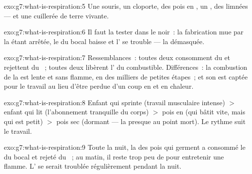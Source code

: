 \begin{solution}{exo:g7:what-is-respiration:5}
Une souris, un cloporte, des pois en , un , des
limnées --- et une cuillerée de terre vivante.
\end{solution}

\begin{solution}{exo:g7:what-is-respiration:6}
Il faut la tester dans le noir~: la fabrication mue par la 
étant arrêtée, le  du bocal baisse et l' se
trouble --- la  démasquée.
\end{solution}

\begin{solution}{exo:g7:what-is-respiration:7}
Ressemblances~: toutes deux consomment du  et rejettent du
~; toutes deux libèrent l' du combustible.
Différences~: la combustion de la  est lente et sans flamme,
en des milliers de petites étapes~; et son  est captée pour
le travail au lieu d'être perdue d'un coup en  et en chaleur.
\end{solution}

\begin{solution}{exo:g7:what-is-respiration:8}
Enfant qui sprinte (travail musculaire intense) $>$ enfant qui lit
(l'abonnement tranquille du corps) $>$ pois en  (qui
bâtit vite, mais qui est petit) $>$ pois sec (dormant --- la
 presque au point mort). Le rythme suit le travail.
\end{solution}

\begin{solution}{exo:g7:what-is-respiration:9}
Toute la nuit, la  des pois qui germent a consommé le
 du bocal et rejeté du ~; au matin, il
reste trop peu de  pour entretenir une flamme. L' se serait troublée régulièrement pendant la nuit.
\end{solution}

